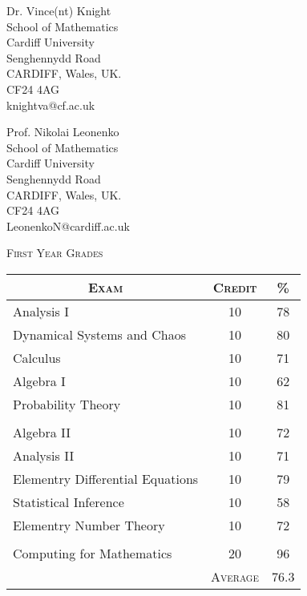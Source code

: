 \documentclass[a4paper]{article}
\begin{document}
\begin{minipage}[b]{0.5\linewidth}
Dr. Vince(nt) Knight\\
School of Mathematics\\
Cardiff University\\
Senghennydd Road\\
CARDIFF, Wales, UK.\\
CF24 4AG\\
knightva@cf.ac.uk
\end{minipage}
%
%
\begin{minipage}[b]{0.5\linewidth}
Prof. Nikolai Leonenko\\
School of Mathematics\\
Cardiff University\\
Senghennydd Road\\
CARDIFF, Wales, UK.\\
CF24 4AG\\
LeonenkoN@cardiff.ac.uk
\end{minipage}
\bigskip
\par{\centering\Large {\textsc{First Year Grades}}
\par}

\begin{center}
\begin{tabular}{lcc}

\multicolumn{1}{c}{\textsc{Exam}} & \textsc{Credit}&\textsc{\%}\\ \hline
Analysis I & 10 & 78\\
Dynamical Systems and Chaos & 10 & 80\\
Calculus & 10 & 71\\
Algebra I & 10 & 62\\
Probability Theory & 10 & 81\\
\\
Algebra II & 10 & 72\\
Analysis II & 10 & 71\\
Elementry Differential Equations & 10 & 79\\
Statistical Inference & 10 & 58\\
Elementry Number Theory & 10 & 72\\
\\
Computing for Mathematics & 20 & 96\\
\cline{2-3}
&\textsc{Average}&76.3

\end{tabular}
\end{center}
\bigskip
\end{document}
